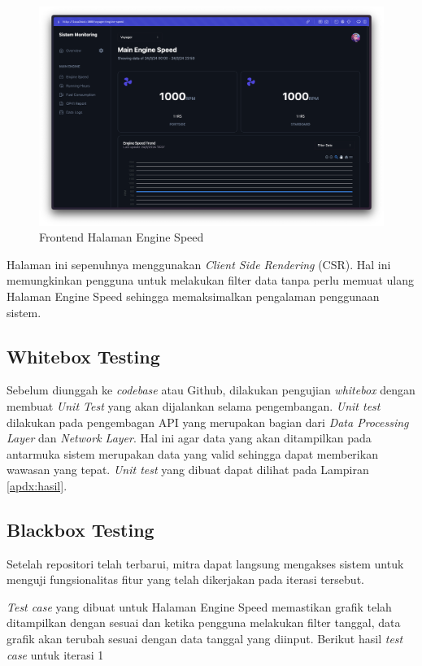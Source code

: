 \begin{figure}[!h]
    \includegraphics[width=1.05\linewidth, center]{images/hasil/iterations/1/fe-es.png}
    \caption{Frontend Halaman Engine Speed}
    \label{fig:fe-es}
\end{figure}

Halaman ini sepenuhnya menggunakan \textit{Client Side Rendering} (CSR). Hal ini memungkinkan pengguna untuk melakukan filter data tanpa perlu memuat ulang Halaman Engine Speed sehingga memaksimalkan pengalaman penggunaan sistem.

\subsection{Whitebox Testing}

Sebelum diunggah ke \textit{codebase} atau Github, dilakukan pengujian \textit{whitebox} dengan membuat \textit{Unit Test} yang akan dijalankan selama pengembangan. \textit{Unit test} dilakukan pada pengembagan API yang merupakan bagian dari \textit{Data Processing Layer} dan \textit{Network Layer}. Hal ini agar data yang akan ditampilkan pada antarmuka sistem merupakan data yang valid sehingga dapat memberikan wawasan yang tepat. \textit{Unit test} yang dibuat dapat dilihat pada Lampiran \ref{apdx:hasil}.

\begin{landscape}

    \subsection{Blackbox Testing}

    Setelah repositori telah terbarui, mitra dapat langsung mengakses sistem untuk menguji fungsionalitas fitur yang telah dikerjakan pada iterasi tersebut.

    

    \textit{Test case} yang dibuat untuk Halaman Engine Speed memastikan grafik telah ditampilkan dengan sesuai dan ketika pengguna melakukan filter tanggal, data grafik akan terubah sesuai dengan data tanggal yang diinput. Berikut hasil \textit{test case} untuk iterasi 1

    
\end{landscape}

